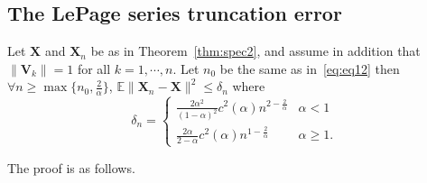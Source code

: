\subsection{The LePage series truncation error}
\label{app:appendixerror}

\begin{theorem}
\label{MSE}
     Let $\mathbf{X}$ and $\mathbf{X}_n$ be as in Theorem~\ref{thm:spec2}, and assume in addition that $\|\mathbf{V}_k\|=1$ for all $k = 1, \cdots, n$. Let $n_0$ be the same as in~\eqref{eq:eq12} then $\forall n\geq \max\{n_0,\frac{2}{\alpha}\}$, $\mathbb{E}\|\mathbf{X}_n-\mathbf{X}\|^2\leq\delta_n$ where  \[
\delta_n=\begin{cases}
 \frac{2\alpha^2}{(1-\alpha)^2}c^{2}(\alpha)n^{2-\frac{2}{\alpha}} &\alpha< 1\\
\frac{2\alpha }{2-\alpha}c^2 (\alpha)n^{1-\frac{2}{\alpha}} & \alpha\geq 1.
\end{cases}
\]
\end{theorem}

The proof is as follows.

